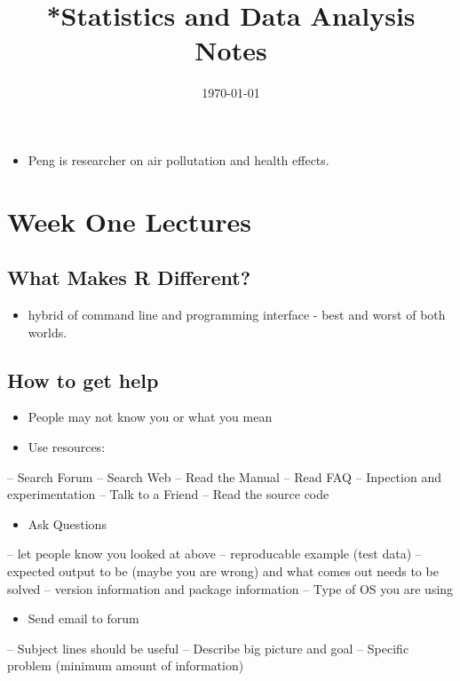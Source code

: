 \documentclass[11pt]{article}
\title{*Statistics and Data Analysis Notes}
\author{}
\date{\today}
\begin{document}
\maketitle

\setcounter{tocdepth}{3}
\tableofcontents
\vspace*{1cm}
\begin{itemize}
\item Peng is researcher on air pollutation and health effects.
\end{itemize}

\section{Week One Lectures}
\label{sec-1}
\subsection{What Makes R Different?}
\label{sec-1-1}

\begin{itemize}
\item hybrid of command line and programming interface - best and worst
  of both worlds.
\end{itemize}
\subsection{How to get help}
\label{sec-1-2}

\begin{itemize}
\item People may not know you or what you mean
\item Use resources:
\end{itemize}
-- Search Forum
-- Search Web
-- Read the Manual
-- Read FAQ
-- Inpection and experimentation
-- Talk to a Friend
-- Read the source code

\begin{itemize}
\item Ask Questions
\end{itemize}
-- let people know you looked at above
-- reproducable example (test data)
-- expected output to be (maybe you are wrong) and what comes out
needs to be solved
-- version information and package information
-- Type of OS you are using

\begin{itemize}
\item Send email to forum
\end{itemize}
-- Subject lines should be useful
-- Describe big picture and goal
-- Specific problem (minimum amount of information)
\end{document}
